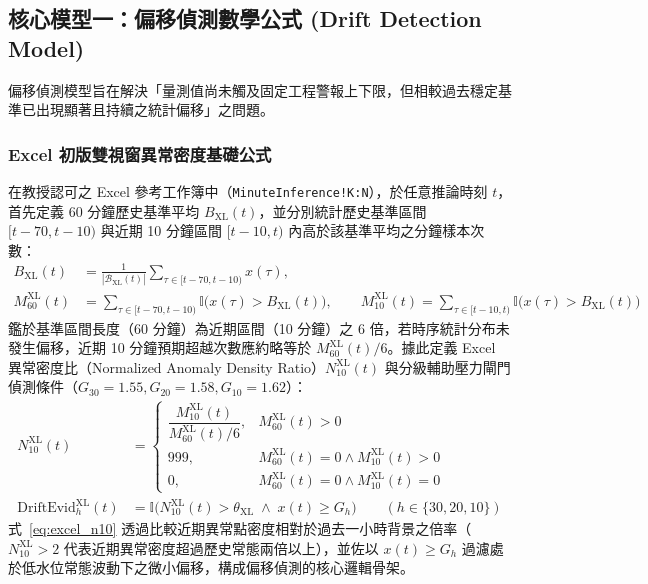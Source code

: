 \documentclass[fontset=none, a4paper, 12pt]{ctexart}
\begin{document}
\begin{doublespace}
\subsection{核心模型一：偏移偵測數學公式 (Drift Detection Model)}
\label{sec:drift_detection}
偏移偵測模型旨在解決「量測值尚未觸及固定工程警報上下限，但相較過去穩定基準已出現顯著且持續之統計偏移」之問題。

\subsubsection{Excel 初版雙視窗異常密度基礎公式}
在教授認可之 Excel 參考工作簿中（\texttt{MinuteInference!K:N}），於任意推論時刻 $t$，首先定義 60 分鐘歷史基準平均 $B_{\mathrm{XL}}(t)$，並分別統計歷史基準區間 $[t-70, t-10)$ 與近期 10 分鐘區間 $[t-10, t)$ 內高於該基準平均之分鐘樣本次數：
\begin{align}
B_{\mathrm{XL}}(t) &= \frac{1}{|\mathcal{B}_{\mathrm{XL}}(t)|}\sum_{\tau \in [t-70, t-10)} x(\tau), \nonumber \\
M_{60}^{\mathrm{XL}}(t) &= \sum_{\tau \in [t-70, t-10)} \mathbb{I}\!\bigl(x(\tau) > B_{\mathrm{XL}}(t)\bigr), \qquad
M_{10}^{\mathrm{XL}}(t) = \sum_{\tau \in [t-10, t)} \mathbb{I}\!\bigl(x(\tau) > B_{\mathrm{XL}}(t)\bigr)
\label{eq:excel_drift_counts}
\end{align}
鑑於基準區間長度（60 分鐘）為近期區間（10 分鐘）之 6 倍，若時序統計分布未發生偏移，近期 10 分鐘預期超越次數應約略等於 $M_{60}^{\mathrm{XL}}(t)/6$。據此定義 Excel 異常密度比（Normalized Anomaly Density Ratio）$N_{10}^{\mathrm{XL}}(t)$ 與分級輔助壓力閘門偵測條件（$G_{30}=1.55, G_{20}=1.58, G_{10}=1.62$）：
\begin{align}
N_{10}^{\mathrm{XL}}(t) &= \begin{cases}
\dfrac{M_{10}^{\mathrm{XL}}(t)}{M_{60}^{\mathrm{XL}}(t)/6}, & M_{60}^{\mathrm{XL}}(t) > 0 \\[8pt]
999, & M_{60}^{\mathrm{XL}}(t)=0 \land M_{10}^{\mathrm{XL}}(t)>0 \\
0, & M_{60}^{\mathrm{XL}}(t)=0 \land M_{10}^{\mathrm{XL}}(t)=0
\end{cases} \nonumber \\
\mathrm{DriftEvid}_{h}^{\mathrm{XL}}(t) &= \mathbb{I}\!\bigl(N_{10}^{\mathrm{XL}}(t) > \theta_{\mathrm{XL}} \;\land\; x(t) \ge G_h\bigr) \qquad (h\in\{30,20,10\})
\label{eq:excel_n10}
\end{align}
式~\eqref{eq:excel_n10} 透過比較近期異常點密度相對於過去一小時背景之倍率（$N_{10}^{\mathrm{XL}} > 2$ 代表近期異常密度超過歷史常態兩倍以上），並佐以 $x(t) \ge G_h$ 過濾處於低水位常態波動下之微小偏移，構成偏移偵測的核心邏輯骨架。


\end{doublespace}
\end{document}
